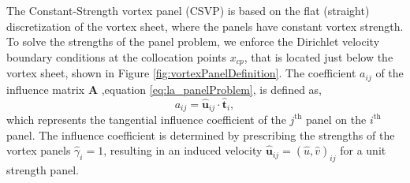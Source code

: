 The Constant-Strength vortex panel ({\color{darkblue}CSVP}) is based on the flat (straight) discretization of the vortex sheet, where the panels have constant vortex strength. To solve the strengths of the panel problem, we enforce the Dirichlet velocity boundary conditions at the collocation points $x_{cp}$, that is located just below the vortex sheet, shown in Figure \ref{fig:vortexPanelDefinition}. The coefficient $a_{ij}$ of the influence matrix $\mathbf{A}$ ,equation \ref{eq:la_panelProblem}, is defined as,
	\begin{equation}
	a_{ij} = \mathbf{\hat{u}}_{ij} \cdot \mathbf{\hat{t}}_i,
	\end{equation}
which represents the tangential influence coefficient of the $j^{\mathrm{th}}$ panel on the $i^{\textrm{th}}$ panel. The influence coefficient is determined by prescribing the strengths of the vortex panels $\hat{\gamma}_i = 1$, resulting in an induced velocity $\mathbf{\hat{u}}_{ij} = \left(\hat{u},\hat{v}\right)_{ij}$ for a unit strength panel.

